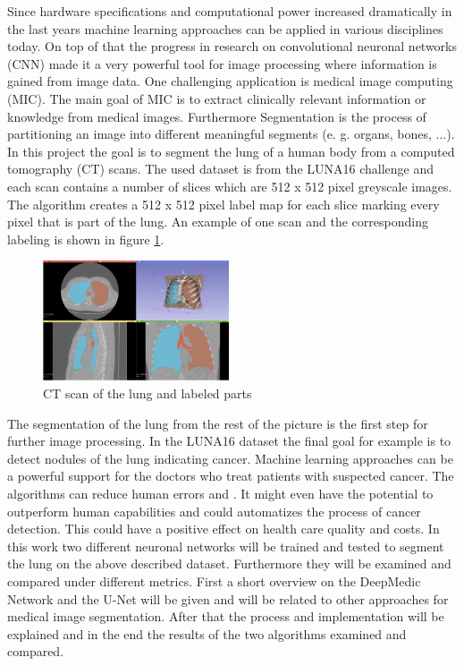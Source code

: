 
Since hardware specifications and computational power increased dramatically in the last years machine learning approaches can be applied in various disciplines today. On top of that the progress in research on convolutional neuronal networks (CNN) made it a very powerful tool for image processing where information is gained from image data.\newline
One challenging application is medical image computing (MIC). The main goal of MIC is to extract clinically relevant information or knowledge from medical images. Furthermore Segmentation is the process of partitioning an image into different meaningful segments (e. g. organs, bones, ...).\newline
In this project the goal is to segment the lung of a human body from a computed tomography (CT) scans.\newline
The used dataset is from the LUNA16 challenge \cite{luna} and each scan contains a number of slices which are 512 x 512 pixel greyscale images. The algorithm creates a 512 x 512 pixel label map for each slice marking every pixel that is part of the lung. An example of one scan and the corresponding labeling is shown in figure \ref{scan_picture}.

\begin{figure}[h!]
	\includegraphics[width=0.49\textwidth, angle=0]{files/scan_picture.jpg}
	\caption{CT scan of the lung and labeled parts}
	\label{scan_picture}
\end{figure}

The segmentation of the lung from the rest of the picture is the first step for further image processing. In the LUNA16 dataset the final goal for example is to detect nodules of the lung indicating cancer. Machine learning approaches can be a powerful support for the doctors who treat patients with suspected cancer. The algorithms can reduce human errors and . It might even have the potential to outperform human capabilities and could automatizes the process of cancer detection. This could have a positive effect on health care quality and costs.\newline
In this work two different neuronal networks will be trained and tested to segment the lung on the above described dataset. Furthermore they will be examined and compared under different metrics.\newline
First a short overview on the DeepMedic Network and the U-Net will be given and will be related to other approaches for medical image segmentation. After that the process and implementation will be explained and in the end the results of the two algorithms examined and compared.
